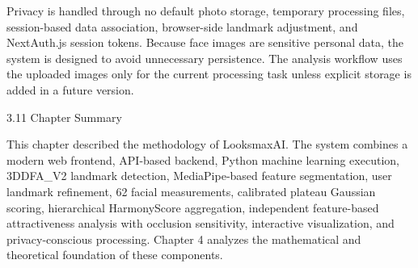 Privacy is handled through no default photo storage, temporary processing files, session-based data association, browser-side landmark adjustment, and NextAuth.js session tokens. Because face images are sensitive personal data, the system is designed to avoid unnecessary persistence. The analysis workflow uses the uploaded images only for the current processing task unless explicit storage is added in a future version.

3.11  Chapter Summary

This chapter described the methodology of LooksmaxAI. The system combines a modern web frontend, API-based backend, Python machine learning execution, 3DDFA_V2 landmark detection, MediaPipe-based feature segmentation, user landmark refinement, 62 facial measurements, calibrated plateau Gaussian scoring, hierarchical HarmonyScore aggregation, independent feature-based attractiveness analysis with occlusion sensitivity, interactive visualization, and privacy-conscious processing. Chapter 4 analyzes the mathematical and theoretical foundation of these components.
